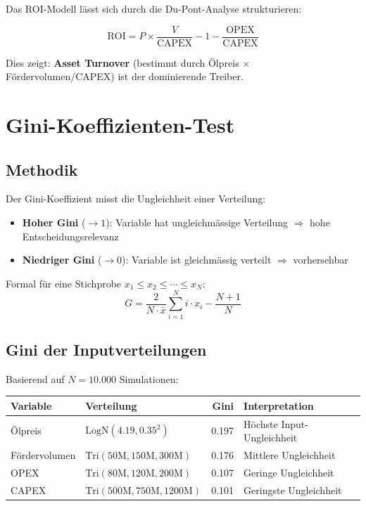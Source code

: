 \documentclass[12pt,a4paper]{article}
\begin{document}
Das ROI-Modell lässt sich durch die Du-Pont-Analyse strukturieren:

\begin{equation}
\text{ROI} = P \times \frac{V}{\text{CAPEX}} - 1 - \frac{\text{OPEX}}{\text{CAPEX}}
\end{equation}

Dies zeigt: \textbf{Asset Turnover} (bestimmt durch Ölpreis $\times$ Fördervolumen/CAPEX) ist der dominierende Treiber.

\section{Gini-Koeffizienten-Test}

\subsection{Methodik}

Der Gini-Koeffizient misst die Ungleichheit einer Verteilung:
\begin{itemize}
\item \textbf{Hoher Gini} ($\to 1$): Variable hat ungleichmässige Verteilung $\Rightarrow$ hohe Entscheidungsrelevanz
\item \textbf{Niedriger Gini} ($\to 0$): Variable ist gleichmässig verteilt $\Rightarrow$ vorhersehbar
\end{itemize}

Formal für eine Stichprobe $x_1 \leq x_2 \leq \cdots \leq x_N$:
\begin{equation}
G = \frac{2}{N \cdot \bar{x}} \sum_{i=1}^{N} i \cdot x_i - \frac{N+1}{N}
\end{equation}

\subsection{Gini der Inputverteilungen}

Basierend auf $N = 10.000$ Simulationen:

\begin{table}[h]
\centering
\begin{tabular}{llrl}
\toprule
\textbf{Variable} & \textbf{Verteilung} & \textbf{Gini} & \textbf{Interpretation} \\
\midrule
Ölpreis & $\text{LogN}(4.19, 0.35^2)$ & 0.197 & Höchste Input-Ungleichheit \\
Fördervolumen & $\text{Tri}(50\text{M}, 150\text{M}, 300\text{M})$ & 0.176 & Mittlere Ungleichheit \\
OPEX & $\text{Tri}(80\text{M}, 120\text{M}, 200\text{M})$ & 0.107 & Geringe Ungleichheit \\
CAPEX & $\text{Tri}(500\text{M}, 750\text{M}, 1200\text{M})$ & 0.101 & Geringste Ungleichheit \\
\bottomrule
\end{tabular}
\end{table}
\end{document}
